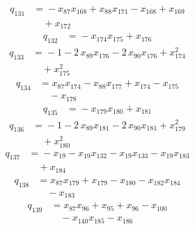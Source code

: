 \begin{align*}
q_{131} &={}-x_{87}x_{168} +x_{88}x_{171} -x_{168} +x_{169}\\
&\quad +x_{172}
\end{align*}
\begin{align*}
q_{132} &={}-x_{174}x_{175} +x_{176}
\end{align*}
\begin{align*}
q_{133} &={}-1 -2\,x_{89}x_{176} -2\,x_{90}x_{176} +x_{174}^{2}\\
&\quad +x_{175}^{2}
\end{align*}
\begin{align*}
q_{134} &={}x_{87}x_{174} -x_{88}x_{177} +x_{174} -x_{175}\\
&\quad -x_{178}
\end{align*}
\begin{align*}
q_{135} &={}-x_{179}x_{180} +x_{181}
\end{align*}
\begin{align*}
q_{136} &={}-1 -2\,x_{89}x_{181} -2\,x_{90}x_{181} +x_{179}^{2}\\
&\quad +x_{180}^{2}
\end{align*}
\begin{align*}
q_{137} &={}-x_{19} -x_{19}x_{132} -x_{19}x_{133} -x_{19}x_{183}\\
&\quad +x_{184}
\end{align*}
\begin{align*}
q_{138} &={}x_{87}x_{179} +x_{179} -x_{180} -x_{182}x_{184}\\
&\quad -x_{183}
\end{align*}
\begin{align*}
q_{139} &={}x_{87}x_{96} +x_{95} +x_{96} -x_{100}\\
&\quad -x_{140}x_{185} -x_{186}
\end{align*}

